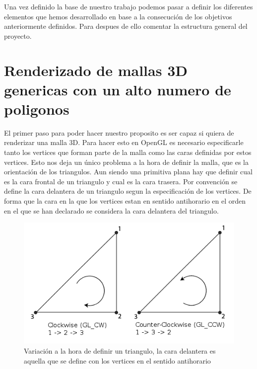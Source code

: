 Una vez definido la base de nuestro trabajo podemos pasar a definir los diferentes elementos que hemos desarrollado en base a la consecución de los objetivos anteriormente definidos. Para despues de ello comentar la estructura general del proyecto.

\section{Renderizado de mallas 3D genericas con un alto numero de poligonos}

El primer paso para poder hacer nuestro proposito es ser capaz si quiera de renderizar una malla 3D. Para hacer esto en OpenGL es necesario especificarle tanto los vertices que forman parte de la malla como las caras definidas por estos vertices. Esto nos deja un único problema a la hora de definir la malla, que es la orientación de los triangulos. Aun siendo una primitiva plana hay que definir cual es la cara frontal de un triangulo y cual es la cara trasera. Por convención se define la cara delantera de un triangulo segun la especificación de los vertices. De forma que la cara en la que los vertices estan en sentido antihorario en el orden en el que se han declarado se considera la cara delantera del triangulo.

\begin{figure}
\centering
\includegraphics[scale=0.5]{imagenes/Winding_order.png}
\caption[Definicion de un triangulo]{Variación a la hora de definir un triangulo, la cara delantera es aquella que se define con los vertices en el sentido antihorario}

\end{figure}

